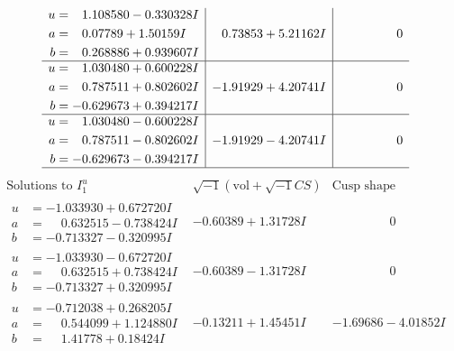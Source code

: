 \documentclass[1p]{elsarticle_modified}
\theoremstyle{definition}
\newcommand{\I}{\sqrt{-1}}
\begin{document}
$$\begin{array}{c|c|c}
\begin{aligned}
u &= \phantom{-}1.108580 - 0.330328 I \\
a &= \phantom{-}0.07789 + 1.50159 I \\
b &= \phantom{-}0.268886 + 0.939607 I\end{aligned}
 & \phantom{-}0.73853 + 5.21162 I & \phantom{-0.000000 } 0 \\ \hline\begin{aligned}
u &= \phantom{-}1.030480 + 0.600228 I \\
a &= \phantom{-}0.787511 + 0.802602 I \\
b &= -0.629673 + 0.394217 I\end{aligned}
 & -1.91929 + 4.20741 I & \phantom{-0.000000 } 0 \\ \hline\begin{aligned}
u &= \phantom{-}1.030480 - 0.600228 I \\
a &= \phantom{-}0.787511 - 0.802602 I \\
b &= -0.629673 - 0.394217 I\end{aligned}
 & -1.91929 - 4.20741 I & \phantom{-0.000000 } 0\\
 \hline 
 \end{array}$$\newpage$$\begin{array}{c|c|c}  
\text{Solutions to }I^u_{1}& \I (\text{vol} + \sqrt{-1}CS) & \text{Cusp shape}\\
 \hline 
\begin{aligned}
u &= -1.033930 + 0.672720 I \\
a &= \phantom{-}0.632515 - 0.738424 I \\
b &= -0.713327 - 0.320995 I\end{aligned}
 & -0.60389 + 1.31728 I & \phantom{-0.000000 } 0 \\ \hline\begin{aligned}
u &= -1.033930 - 0.672720 I \\
a &= \phantom{-}0.632515 + 0.738424 I \\
b &= -0.713327 + 0.320995 I\end{aligned}
 & -0.60389 - 1.31728 I & \phantom{-0.000000 } 0 \\ \hline\begin{aligned}
u &= -0.712038 + 0.268205 I \\
a &= \phantom{-}0.544099 + 1.124880 I \\
b &= \phantom{-}1.41778 + 0.18424 I\end{aligned}
 & -0.13211 + 1.45451 I & -1.69686 - 4.01852 I \\ \hline\begin{aligned}

\end{aligned}
\end{array}$$
\end{document}
